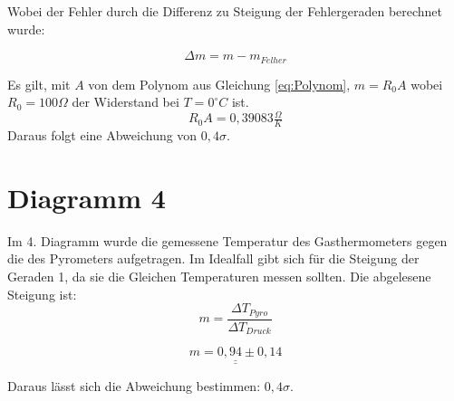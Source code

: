 Wobei der Fehler durch die Differenz zu Steigung der Fehlergeraden berechnet wurde:

\begin{equation}
    \Delta m = m- m_{Felher}
    \label{eq:SteigungFehler}
\end{equation}

Es gilt, mit $A $ von dem Polynom aus Gleichung \ref{eq:Polynom}, $m = R_0 A$ wobei $R_0 = 100 \Omega$ der Widerstand bei $T= 0^\circ C$ ist.
\[ R_0 A = 0,39083 \tfrac{\Omega}{K}\]
Daraus folgt eine Abweichung von $0,4 \sigma$.

\section{Diagramm 4}
Im 4. Diagramm wurde die gemessene Temperatur des Gasthermometers gegen die des Pyrometers aufgetragen.
Im Idealfall gibt sich für die Steigung der Geraden 1, da sie die Gleichen Temperaturen messen sollten.
Die abgelesene Steigung ist:
\begin{equation}
    m = \frac{\Delta T_{Pyro}}{\Delta T_{Druck}}
\end{equation}

\[\underline{\underline{ m = 0,94 \pm 0,14 }}\]

Daraus lässt sich die Abweichung bestimmen: $0,4 \sigma$.